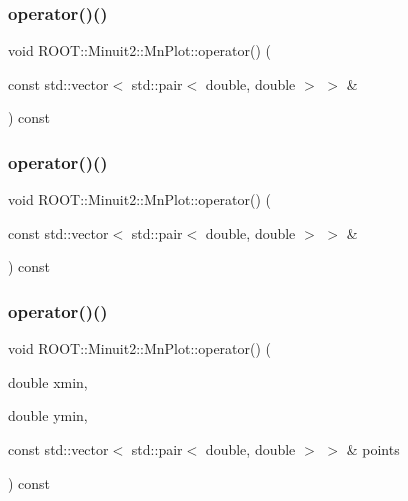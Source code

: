 \subsubsection{\texorpdfstring{operator()()}{operator()()}\hspace{0.1cm}{\footnotesize\ttfamily [2/6]}}
{\footnotesize\ttfamily void R\+O\+O\+T\+::\+Minuit2\+::\+Mn\+Plot\+::operator() (\begin{DoxyParamCaption}\item[{const std\+::vector$<$ std\+::pair$<$ double, double $>$ $>$ \&}]{ }\end{DoxyParamCaption}) const}

\mbox{\label{classROOT_1_1Minuit2_1_1MnPlot_a118857899dee9d8222acc5c4926956ca}} 
\subsubsection{\texorpdfstring{operator()()}{operator()()}\hspace{0.1cm}{\footnotesize\ttfamily [3/6]}}
{\footnotesize\ttfamily void R\+O\+O\+T\+::\+Minuit2\+::\+Mn\+Plot\+::operator() (\begin{DoxyParamCaption}\item[{const std\+::vector$<$ std\+::pair$<$ double, double $>$ $>$ \&}]{ }\end{DoxyParamCaption}) const}

\mbox{\label{classROOT_1_1Minuit2_1_1MnPlot_a6cae4ab8961e9f7933320789d101ec1e}} 
\subsubsection{\texorpdfstring{operator()()}{operator()()}\hspace{0.1cm}{\footnotesize\ttfamily [4/6]}}
{\footnotesize\ttfamily void R\+O\+O\+T\+::\+Minuit2\+::\+Mn\+Plot\+::operator() (\begin{DoxyParamCaption}\item[{double}]{xmin,  }\item[{double}]{ymin,  }\item[{const std\+::vector$<$ std\+::pair$<$ double, double $>$ $>$ \&}]{points }\end{DoxyParamCaption}) const}

